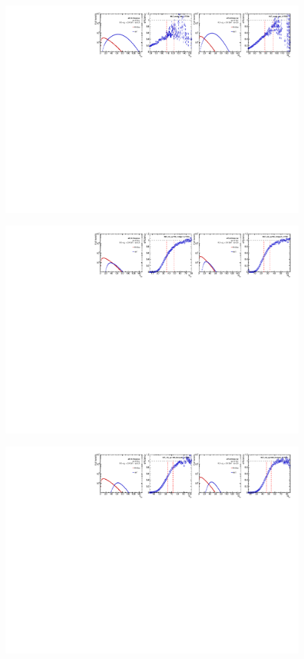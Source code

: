 \begin{figure}[H]
\centering
\includegraphics[width=1.\linewidth]{figs/sec_evtSlc/trigEff_pp13_run3/trigEff_Trig2.pdf}
\end{figure}
\begin{figure}[H]
\centering
\includegraphics[width=1.\linewidth]{figs/sec_evtSlc/trigEff_pp13_run3/trigEff_Trig6.pdf}
\end{figure}
\begin{figure}[H]
\centering
\includegraphics[width=1.\linewidth]{figs/sec_evtSlc/trigEff_pp13_run3/trigEff_Trig7.pdf}
\end{figure}
